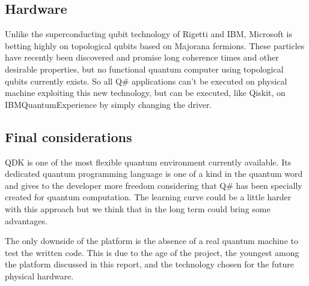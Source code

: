 \documentclass[main.tex]{subfiles}
\begin{document}
	\subsection{Hardware}
	Unlike the superconducting qubit technology of Rigetti
and IBM, Microsoft is betting highly on topological
qubits based on Majorana fermions. These particles
have recently been discovered and promise long coherence times and other desirable properties, but no functional quantum computer using topological qubits currently exists. So all Q\# applications can't be executed on physical machine exploiting this new technology, but can be executed, like Qiskit, on IBMQuantumExperience by simply changing the driver.

	\subsection{Final considerations}
	QDK is one of the most flexible quantum environment currently available. Its dedicated quantum programming language is one of a kind in the quantum word and gives to the developer more freedom considering that Q\# has been specially created for quantum computation. The learning curve could be a little harder with this approach but we think that in the long term could bring some advantages.
	
	The only downside of the platform is the absence of a real quantum machine to test the written code. This is due to the age of the project, the youngest among the platform discussed in this report, and the technology chosen for the future physical hardware.
\end{document}
